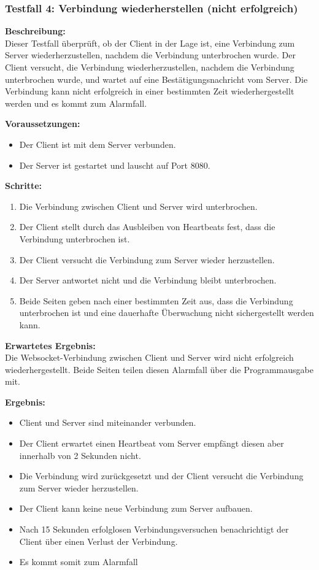 \documentclass[thesis.tex]{subfiles}
\begin{document}
\pagebreak

\subsubsection*{Testfall 4: Verbindung wiederherstellen (nicht erfolgreich)}

\textbf{Beschreibung:}\\
Dieser Testfall überprüft, ob der Client in der Lage ist, eine Verbindung zum Server wiederherzustellen, nachdem die Verbindung unterbrochen wurde. Der Client versucht, die Verbindung wiederherzustellen, nachdem die Verbindung unterbrochen wurde, und wartet auf eine Bestätigungsnachricht vom Server. Die Verbindung kann nicht erfolgreich in einer bestimmten Zeit wiederhergestellt werden und es kommt zum Alarmfall.

\textbf{Voraussetzungen:}
\begin{itemize}
    \item Der Client ist mit dem Server verbunden.
    \item Der Server ist gestartet und lauscht auf Port 8080.
\end{itemize}

\textbf{Schritte:}
\begin{enumerate}
    \item Die Verbindung zwischen Client und Server wird unterbrochen.
    \item Der Client stellt durch das Ausbleiben von Heartbeats fest, dass die Verbindung unterbrochen ist.
    \item Der Client versucht die Verbindung zum Server wieder herzustellen.
    \item Der Server antwortet nicht und die Verbindung bleibt unterbrochen.
    \item Beide Seiten geben nach einer bestimmten Zeit aus, dass die Verbindung unterbrochen ist und eine dauerhafte Überwachung nicht sichergestellt werden kann.
\end{enumerate}

\textbf{Erwartetes Ergebnis:}\\
Die Websocket-Verbindung zwischen Client und Server wird nicht erfolgreich wiederhergestellt. Beide Seiten teilen diesen Alarmfall über die Programmausgabe mit.

\textbf{Ergebnis:}
\begin{itemize}
    \item Client und Server sind miteinander verbunden.
    \item Der Client erwartet einen Heartbeat vom Server empfängt diesen aber innerhalb von 2 Sekunden nicht.
    \item Die Verbindung wird zurückgesetzt und der Client versucht die Verbindung zum Server wieder herzustellen.
    \item Der Client kann keine neue Verbindung zum Server aufbauen.
    \item Nach 15 Sekunden erfolglosen Verbindungsversuchen benachrichtigt der Client über einen Verlust der Verbindung.
    \item Es kommt somit zum Alarmfall
\end{itemize}
\end{document}
